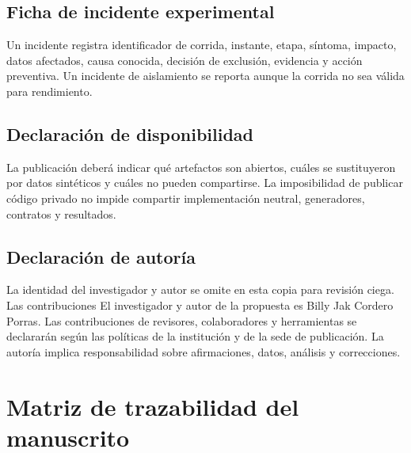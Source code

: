 \section{Ficha de incidente experimental}

Un incidente registra identificador de corrida, instante, etapa, síntoma, impacto, datos afectados, causa
conocida, decisión de exclusión, evidencia y acción preventiva. Un incidente de
aislamiento se reporta aunque la corrida no sea válida para rendimiento.

\section{Declaración de disponibilidad}

La publicación deberá indicar qué artefactos son abiertos, cuáles se sustituyeron por
datos sintéticos y cuáles no pueden compartirse. La imposibilidad de publicar código
privado no impide compartir implementación neutral, generadores, contratos y resultados.

\section{Declaración de autoría}

\ifnum{}
La identidad del investigador y autor se omite en esta copia para revisión ciega. Las contribuciones
\else
El investigador y autor de la propuesta es Billy Jak Cordero Porras. Las contribuciones
\fi
de revisores, colaboradores y herramientas se declararán según las políticas de la
institución y de la sede de publicación. La autoría implica responsabilidad sobre
afirmaciones, datos, análisis y correcciones.

\chapter{Matriz de trazabilidad del manuscrito}

